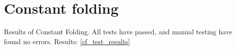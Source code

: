 \section{Constant folding}

Results of Constant Folding.
All tests have passed, and manual testing have found no errors.
Results:
\ref{cf_test_results}

